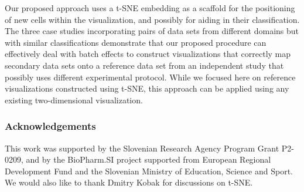 \documentclass[runningheads]{llncs}
\begin{document}
Our proposed approach uses a t-SNE embedding as a scaffold for the positioning
of new cells within the visualization, and possibly for aiding in their
classification. The three case studies incorporating pairs of data sets from
different domains but with similar classifications demonstrate that our
proposed procedure can effectively deal with batch effects to construct
visualizations that correctly map secondary data sets onto a reference data set
from an independent study that possibly uses different experimental protocol.
While we focused here on reference visualizations constructed using t-SNE, this
approach can be applied using any existing two-dimensional visualization.

\subsubsection*{Acknowledgements}

This work was supported by the Slovenian Research Agency Program Grant P2-0209,
and by the BioPharm.SI project supported from European Regional Development
Fund and the Slovenian Ministry of Education, Science and Sport. We would also
like to thank Dmitry Kobak for discussions on t-SNE.

% 


\end{document}
